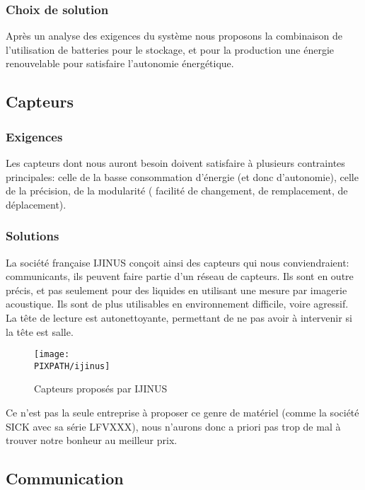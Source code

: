 \subsubsection{Choix de solution}
Après un analyse des exigences du syst\`eme nous proposons la combinaison de l'utilisation de batteries pour le stockage, et pour la production une \'{e}nergie renouvelable pour satisfaire l'autonomie \'{e}nerg\'{e}tique.

\subsection{Capteurs}

\subsubsection{Exigences}
Les capteurs dont nous auront besoin doivent satisfaire à plusieurs
contraintes principales: celle de la basse consommation d'énergie
(et donc d'autonomie), celle de la précision, de la modularité (
facilité de changement, de remplacement, de déplacement).

\subsubsection{Solutions}
La société française IJINUS conçoit ainsi des capteurs qui nous
conviendraient: communicants, ils peuvent faire partie d'un
réseau de capteurs. Ils sont en outre précis, et pas seulement
pour des liquides en utilisant une mesure par imagerie acoustique.
Ils sont de plus utilisables en environnement difficile, voire agressif.
La tête de lecture est autonettoyante, permettant de ne pas avoir
à intervenir si la tête est salle.

\begin{figure}[!h]
\begin{center}

\texttt{[image: \\PIXPATH/ijinus]}
\caption{Capteurs proposés par IJINUS}
\end{center}
\end{figure}

Ce n'est pas la seule entreprise à proposer ce genre de matériel (comme la société SICK avec sa série LFVXXX), nous
n'aurons donc a priori pas trop de mal à trouver notre bonheur au meilleur
prix.


\subsection{Communication}

